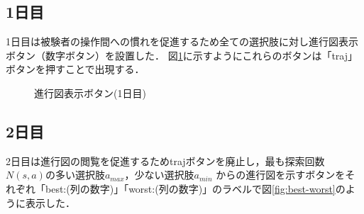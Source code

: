 \subsection{1日目}
1日目は被験者の操作間への慣れを促進するため全ての選択肢に対し進行図表示ボタン（数字ボタン）を設置した．
図\ref{fig:traj-button}に示すようにこれらのボタンは「traj」ボタンを押すことで出現する．

\begin{figure}[htbp]
    \centering
    \setlength{\fboxsep}{1pt} %
    \setlength{\fboxrule}{1pt} %
    \caption{進行図表示ボタン(1日目)}
	\label{fig:traj-button}
\end{figure}

\subsection{2日目}
2日目は進行図の閲覧を促進するためtrajボタンを廃止し，最も探索回数$N(s,a)$の多い選択肢$a_{max}$，少ない選択肢$a_{min}$
からの進行図を示すボタンをそれぞれ「best:(列の数字)」「worst:(列の数字)」のラベルで図\ref{fig:best-worst}のように表示した．

